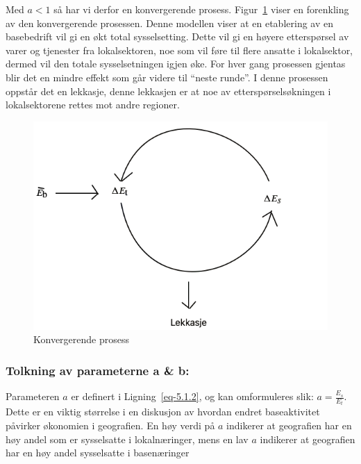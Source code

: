 \documentclass[
]{article}
\begin{document}
Med \(a<1\) så har vi derfor en konvergerende prosess.
Figur~\ref{fig-con-pro} viser en forenkling av den konvergerende
prosessen. Denne modellen viser at en etablering av en basebedrift vil
gi en økt total sysselsetting. Dette vil gi en høyere etterspørsel av
varer og tjenester fra lokalsektoren, noe som vil føre til flere ansatte
i lokalsektor, dermed vil den totale sysselsetningen igjen øke. For hver
gang prosessen gjentas blir det en mindre effekt som går videre til
``neste runde''. I denne prosessen oppstår det en lekkasje, denne
lekkasjen er at noe av etterspørselsøkningen i lokalsektorene rettes mot
andre regioner.

\begin{figure}[H]

{\centering \includegraphics{bilder/konvergerende.png}

}

\caption{\label{fig-con-pro}Konvergerende prosess}

\end{figure}

\hypertarget{tolkning-av-parameterne-a-b}{%
\subsubsection{Tolkning av parameterne a \&
b:}\label{tolkning-av-parameterne-a-b}}

Parameteren \(a\) er definert i Ligning~\ref{eq-5.1.2}, og kan
omformuleres slik: \(a = \frac{E_s}{E_t}\). Dette er en viktig størrelse
i en diskusjon av hvordan endret baseaktivitet påvirker økonomien i
geografien. En høy verdi på \(a\) indikerer at geografien har en høy
andel som er sysselsatte i lokalnæringer, mens en lav \(a\) indikerer at
geografien har en høy andel sysselsatte i basenæringer
\end{document}

